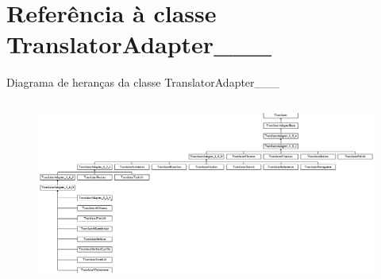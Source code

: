\hypertarget{class_translator_adapter__1__8__2}{\section{Referência à classe Translator\-Adapter\-\_\-\_\-\_}
\label{class_translator_adapter__1__8__2}
}
Diagrama de heranças da classe Translator\-Adapter\-\_\-\_\-\_\begin{figure}[H]
\begin{center}
\leavevmode
\includegraphics[height=6.070461cm]{class_translator_adapter__1__8__2}
\end{center}
\end{figure}

